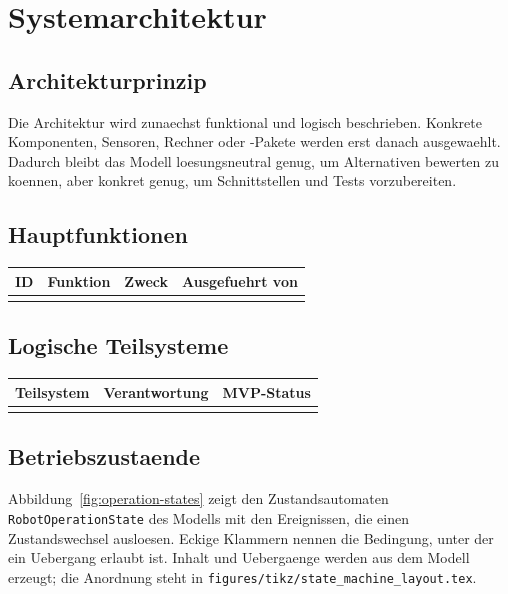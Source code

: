 \chapter{Systemarchitektur}

\section{Architekturprinzip}

Die Architektur wird zunaechst funktional und logisch beschrieben. Konkrete Komponenten, Sensoren, Rechner oder \ros-Pakete werden erst danach ausgewaehlt. Dadurch bleibt das Modell loesungsneutral genug, um Alternativen bewerten zu koennen, aber konkret genug, um Schnittstellen und Tests vorzubereiten.

\section{Hauptfunktionen}

\begin{longtable}{L{0.15\textwidth} L{0.22\textwidth} L{0.30\textwidth} L{0.19\textwidth}}
\toprule
ID & Funktion & Zweck & Ausgefuehrt von \\
\midrule
{}
\bottomrule
\end{longtable}

\section{Logische Teilsysteme}

\begin{longtable}{L{0.22\textwidth} L{0.46\textwidth} L{0.18\textwidth}}
\toprule
Teilsystem & Verantwortung & MVP-Status \\
\midrule
{}
\bottomrule
\end{longtable}

\section{Betriebszustaende}

Abbildung~\ref{fig:operation-states} zeigt den Zustandsautomaten \texttt{RobotOperationState} des Modells mit den Ereignissen, die einen Zustandswechsel ausloesen. Eckige Klammern nennen die Bedingung, unter der ein Uebergang erlaubt ist. Inhalt und Uebergaenge werden aus dem Modell erzeugt; die Anordnung steht in \texttt{figures/tikz/state\_machine\_layout.tex}.

